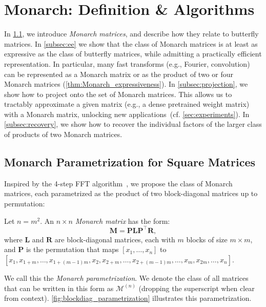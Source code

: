 \section{Monarch: Definition \& Algorithms}
\label{sec:theory}

In \ref{subsec:parametrization}, we introduce \emph{Monarch matrices}, and describe how they relate to butterfly matrices. In \ref{subsec:ee} we show that the class of Monarch matrices is at least as expressive as the class of butterfly matrices, while admitting a practically efficient representation. In particular, many fast transforms (e.g., Fourier, convolution) can be represented as a Monarch matrix or as the product of two or four Monarch matrices (\ref{thm:Monarch_expressiveness}).
In \ref{subsec:projection}, we show how to project onto the set of Monarch matrices. This allows us to tractably approximate a given matrix (e.g., a dense pretrained weight matrix) with a Monarch matrix, unlocking new applications~(cf. \ref{sec:experiments}).
In \ref{subsec:recovery}, we show how to recover the individual factors of the larger class of products of two Monarch matrices.

\subsection{Monarch Parametrization for Square Matrices}
\label{subsec:parametrization}

Inspired by the 4-step FFT algorithm~\citep{bailey1990ffts}, we propose the class of Monarch matrices, each parametrized as the product of two block-diagonal matrices up to permutation:

\begin{definition}\label{def:Monarch}
  Let $n = m^2$. An $n \times n$ \emph{Monarch matrix} has the form:
  \begin{equation*}
    \mathbf{M} = \mathbf{P} \mathbf{L} \mathbf{P}^\top \mathbf{R},
  \end{equation*}
  where $\mathbf{L}$ and $\mathbf{R}$ are block-diagonal matrices, each with $m$ blocks of size $m \times m$, and $\mathbf{P}$ is the permutation that maps $[x_1, \dots, x_n]$ to $[x_1, x_{1+m}, \dots, x_{1+(m-1)m}, x_2, x_{2+m}, \dots,  x_{2+(m-1)m}, \dots, x_{m}, x_{2m}, \dots, x_n]$.
\end{definition}

We call this the \emph{Monarch parametrization}. We denote the class of all matrices that can be written in this form as $\mathcal{M}^{(n)}$ (dropping the superscript when clear from context).
\ref{fig:blockdiag_parametrization} illustrates this parametrization.

